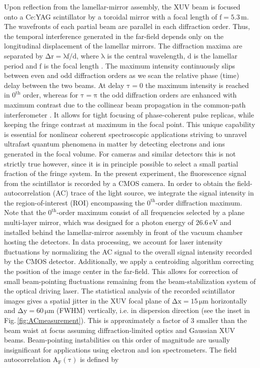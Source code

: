 \documentclass[fleqn,10pt]{wlscirep}
\begin{document}
Upon reflection from the lamellar-mirror assembly, the XUV beam is focused onto a Ce:YAG scintillator by a toroidal mirror with a focal length of $\mathrm{f=5.3\,m}$. The wavefronts of each partial beam are parallel in each diffraction order. Thus, the temporal interference generated in the far-field depends only on the longitudinal displacement of the lamellar mirrors. The diffraction maxima are separated by $\mathrm{\Delta r = \lambda f/d}$, where $\mathrm{\lambda}$ is the central wavelength, $\mathrm{d}$ is the lamellar period and $\mathrm{f}$ is the focal length \cite{UsenkoASB17}. The maximum intensity continuously slips between even and odd diffraction orders as we scan the relative phase (time) delay between the two beams. At delay $\mathrm{\tau=0}$ the maximum intensity is reached in $\mathrm{0^{th}}$ order, whereas for $\mathrm{\tau=\pi}$ the odd diffraction orders are enhanced with maximum contrast due to the collinear beam propagation in the common-path interferometer \cite{UsenkoNAT17}. It allows for tight focusing of phase-coherent pulse replicas, while keeping the fringe contrast at maximum in the focal point. This unique capability is essential for nonlinear coherent spectroscopic applications striving to unravel ultrafast quantum phenomena in matter by detecting electrons and ions generated in the focal volume. For cameras and similar detectors this is not strictly true however, since it is in principle possible to select a small partial fraction of the fringe system. In the present experiment, the fluorescence signal from the scintillator is recorded by a CMOS camera. In order to obtain the field-autocorrelation (AC) trace of the light source, we integrate the signal intensity in the region-of-interest (ROI) encompassing the $\mathrm{0^{th}}$-order diffraction maximum. Note that the $\mathrm{0^{th}}$-order maximum consist of all frequencies selected by a plane multi-layer mirror, which was designed for a photon energy of $\mathrm{26.6\,eV}$ and installed behind the lamellar-mirror assembly in front of the vacuum chamber hosting the detectors. In data processing, we account for laser intensity fluctuations by normalizing the AC signal to the overall signal intensity recorded by the CMOS detector. Additionally, we apply a centroiding algorithm correcting the position of the image center in the far-field. This allows for correction of small beam-pointing fluctuations remaining from the beam-stabilization system of the optical driving laser. The statistical analysis of the recorded scintillator images gives a spatial jitter in the XUV focal plane of $\mathrm{\Delta x = 15\,\mu m}$ horizontally and $\mathrm{\Delta y = 60\,\mu m}$ (FWHM) vertically, i.e. in dispersion direction (see the inset in Fig.\,\ref{fig:ACmeasurement}). This is approximately a factor of 3 smaller than the beam waist at focus assuming diffraction-limited optics and Gaussian XUV beams. Beam-pointing instabilities on this order of magnitude are usually insignificant for applications using electron and ion spectrometers. The field autocorrelation $\mathrm{A_{F}(\tau)}$ is defined by
\end{document}
